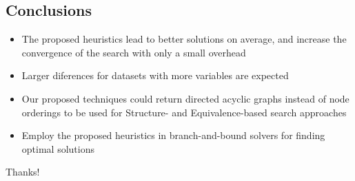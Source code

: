 \subsection{Conclusions}
	\begin{frame}
		\begin{itemize}
			\item The proposed heuristics lead to better solutions on average, and increase the convergence of the search with only a small overhead
			\item Larger diferences for datasets with more variables are expected
			\item Our proposed techniques could return directed acyclic graphs instead of node orderings to be used for Structure- and Equivalence-based search approaches
			\item Employ the proposed heuristics in branch-and-bound solvers for finding optimal solutions
		\end{itemize}
	\end{frame}

\begin{frame}
	\centering
	\LARGE{Thanks!}
\end{frame}